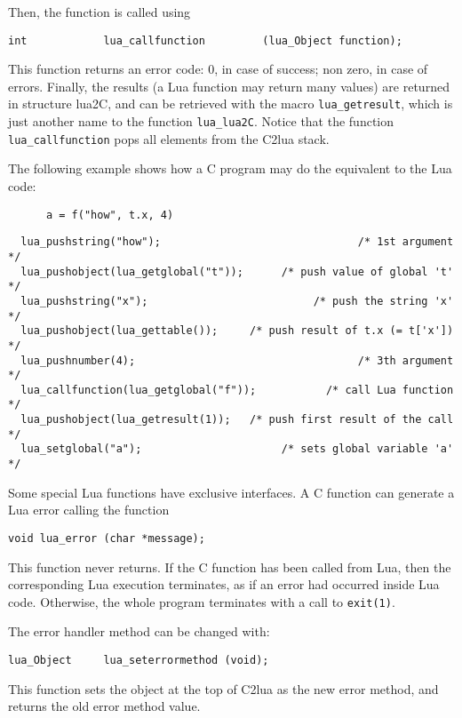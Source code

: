 Then, the function is called using
\begin{verbatim}
int            lua_callfunction         (lua_Object function);
\end{verbatim}
This function returns an error code:
0, in case of success; non zero, in case of errors.
Finally, the results (a Lua function may return many values)
are returned in structure lua2C,
and can be retrieved with the macro \verb|lua_getresult|,
which is just another name to the function \verb|lua_lua2C|.
Notice that the function \verb|lua_callfunction|
pops all elements from the C2lua stack.

The following example shows how a C program may do the
equivalent to the Lua code:
\begin{verbatim}
      a = f("how", t.x, 4)
\end{verbatim}
\begin{verbatim}
  lua_pushstring("how");                               /* 1st argument */
  lua_pushobject(lua_getglobal("t"));      /* push value of global 't' */
  lua_pushstring("x");                          /* push the string 'x' */
  lua_pushobject(lua_gettable());     /* push result of t.x (= t['x']) */
  lua_pushnumber(4);                                   /* 3th argument */
  lua_callfunction(lua_getglobal("f"));           /* call Lua function */
  lua_pushobject(lua_getresult(1));   /* push first result of the call */
  lua_setglobal("a");                      /* sets global variable 'a' */
\end{verbatim}

Some special Lua functions have exclusive interfaces.
A C function can generate a Lua error calling the function
\begin{verbatim}
void lua_error (char *message);
\end{verbatim}
This function never returns.
If the C function has been called from Lua,
then the corresponding Lua execution terminates,
as if an error had occurred inside Lua code.
Otherwise, the whole program terminates with a call to \verb|exit(1)|.

The error handler method  can be changed with:
\begin{verbatim}
lua_Object     lua_seterrormethod (void);
\end{verbatim}
This function sets the object at the top of C2lua
as the new error method,
and returns the old error method value.

